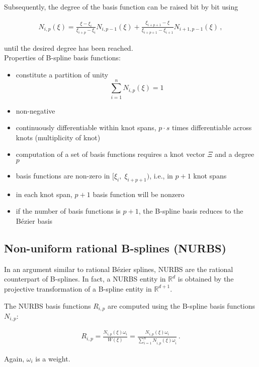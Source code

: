 \documentclass[11pt,a4paper]{article}
\begin{document}
Subsequently, the degree of the basis function can be raised bit by bit using

\begin{align}
N_{i,p}(\xi)=\frac{\xi-\xi_{i}}{\xi_{i+p}-\xi_{i}}N_{i,p-1}(\xi)+\frac{\xi_{i+p+1}-\xi}{\xi_{i+p+1}-\xi_{i+1}}N_{i+1,p-1}(\xi) \,,
\end{align}

until the desired degree has been reached.
\\

		Properties of B-spline basis functions:
	\begin{itemize}
		\item constitute a partition of unity
		\[\sum_{i=1}^{n}N_{i,p}(\xi)=1\]
		\item non-negative
		\item continuously differentiable within knot spans, $p\cdot s$ times differentiable across knots (multiplicity of knot)
		\item computation of a set of basis functions requires a knot vector $\Xi$ and a degree $p$
		\item basis functions are non-zero in $[\xi_{i},\;\xi_{i+p+1})$, i.e., in $p+1$ knot spans
		\item in each knot span, $p+1$ basis function will be nonzero
		\item if the number of basis functions is $p+1$, the B-spline basis reduces to the Bézier basis
	\end{itemize}



\subsection{Non-uniform rational B-splines (NURBS)}

In an argument similar to rational Bézier splines, NURBS are the rational counterpart of B-splines. In fact, a NURBS entity in $\mathbb{R}^{d}$ is obtained by the projective transformation of a B-spline entity in $\mathbb{R}^{d+1}$.

The NURBS basis functions $R_{i,p}$ are computed using the B-spline basis functions $ N_{i,p} $:

\begin{align}
R_{i,p}=\frac{N_{i,p}(\xi)\omega_{i}}{W(\xi)}=\frac{N_{i,p}(\xi)\omega_{i}}{\sum_{\hat{i}=1}^{n}N_{\hat{i},p}(\xi)\omega_{\hat{i}}} \,.
\end{align}

Again, $\omega_i$ is a weight.
\end{document}
